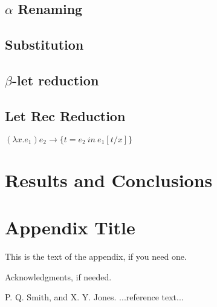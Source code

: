 \documentclass[preprint]{sigplanconf}
\begin{document}
\subsection{$\alpha$ Renaming}

\subsection{Substitution}

\subsection{$\beta$-let reduction}

\subsection{Let Rec Reduction}
$(\lambda x.e_{1})e_{2} \rightarrow \lbrace t = e_{2}\ in\ e_{1}[t/x] \rbrace$

\section{Results and Conclusions}

\appendix
\section{Appendix Title}

This is the text of the appendix, if you need one.

\acks

Acknowledgments, if needed.





\begin{thebibliography}{}
\softraggedright

P. Q. Smith, and X. Y. Jones. ...reference text...

\end{thebibliography}
\end{document}
